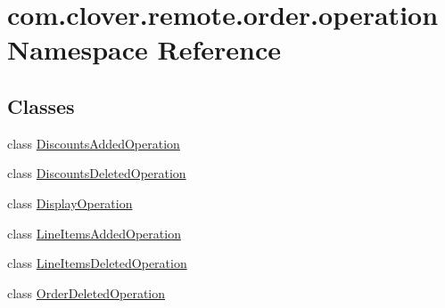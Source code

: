 \hypertarget{namespacecom_1_1clover_1_1remote_1_1order_1_1operation}{}\section{com.\+clover.\+remote.\+order.\+operation Namespace Reference}
\label{namespacecom_1_1clover_1_1remote_1_1order_1_1operation}
\subsection*{Classes}
\begin{DoxyCompactItemize}
\item 
class \hyperlink{classcom_1_1clover_1_1remote_1_1order_1_1operation_1_1_discounts_added_operation}{Discounts\+Added\+Operation}
\item 
class \hyperlink{classcom_1_1clover_1_1remote_1_1order_1_1operation_1_1_discounts_deleted_operation}{Discounts\+Deleted\+Operation}
\item 
class \hyperlink{classcom_1_1clover_1_1remote_1_1order_1_1operation_1_1_display_operation}{Display\+Operation}
\item 
class \hyperlink{classcom_1_1clover_1_1remote_1_1order_1_1operation_1_1_line_items_added_operation}{Line\+Items\+Added\+Operation}
\item 
class \hyperlink{classcom_1_1clover_1_1remote_1_1order_1_1operation_1_1_line_items_deleted_operation}{Line\+Items\+Deleted\+Operation}
\item 
class \hyperlink{classcom_1_1clover_1_1remote_1_1order_1_1operation_1_1_order_deleted_operation}{Order\+Deleted\+Operation}
\end{DoxyCompactItemize}
